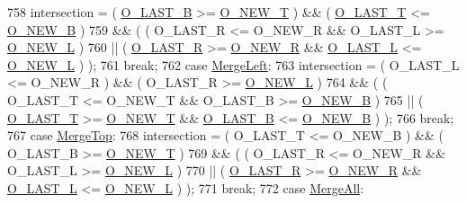 \begin{DoxyCode}
758                 intersection = ( \hyperlink{area_8h_acb5c5436194a8d4ad5b3c76166d25820}{O\_LAST\_B} >= \hyperlink{area_8h_a88003092895c0a5496264ade43c4ae60}{O\_NEW\_T} ) && ( 
      \hyperlink{area_8h_acf8cff7a963f611164914655a5fad217}{O\_LAST\_T} <= \hyperlink{area_8h_a4e865e98f50bf8070b1c2bfa6dd1eb3f}{O\_NEW\_B} )
759                                && ( ( O\_LAST\_R <= O\_NEW\_R && O\_LAST\_L >= \hyperlink{area_8h_a8a12d1980d75a4918cb7473c87253b3d}{O\_NEW\_L} )
760                                   || ( \hyperlink{area_8h_ad0961130bf7b05cc0225946ccdec8536}{O\_LAST\_R} >= \hyperlink{area_8h_a2102e0d0f3fd7e0313c5e99cc1a40522}{O\_NEW\_R} && 
      \hyperlink{area_8h_a19d8ec29fbb2b8db2051d5b6ae7bed55}{O\_LAST\_L} <= \hyperlink{area_8h_a8a12d1980d75a4918cb7473c87253b3d}{O\_NEW\_L} ) );
761                 \textcolor{keywordflow}{break};
762             \textcolor{keywordflow}{case} \hyperlink{namespaceOkular_ad98deec425adfb02ba05a78568bcccebadd181d06ce9bf13ee34d11b136c891dc}{MergeLeft}:
763                 intersection = ( O\_LAST\_L <= O\_NEW\_R ) && ( O\_LAST\_R >= \hyperlink{area_8h_a8a12d1980d75a4918cb7473c87253b3d}{O\_NEW\_L} )
764                                && ( ( O\_LAST\_T <= O\_NEW\_T && O\_LAST\_B >= \hyperlink{area_8h_a4e865e98f50bf8070b1c2bfa6dd1eb3f}{O\_NEW\_B} )
765                                   || ( \hyperlink{area_8h_acf8cff7a963f611164914655a5fad217}{O\_LAST\_T} >= \hyperlink{area_8h_a88003092895c0a5496264ade43c4ae60}{O\_NEW\_T} && 
      \hyperlink{area_8h_acb5c5436194a8d4ad5b3c76166d25820}{O\_LAST\_B} <= \hyperlink{area_8h_a4e865e98f50bf8070b1c2bfa6dd1eb3f}{O\_NEW\_B} ) );
766                 \textcolor{keywordflow}{break};
767             \textcolor{keywordflow}{case} \hyperlink{namespaceOkular_ad98deec425adfb02ba05a78568bccceba7e844b878ae71c6724c6762f26b41b8e}{MergeTop}:
768                 intersection = ( O\_LAST\_T <= O\_NEW\_B ) && ( O\_LAST\_B >= \hyperlink{area_8h_a88003092895c0a5496264ade43c4ae60}{O\_NEW\_T} )
769                                && ( ( O\_LAST\_R <= O\_NEW\_R && O\_LAST\_L >= \hyperlink{area_8h_a8a12d1980d75a4918cb7473c87253b3d}{O\_NEW\_L} )
770                                   || ( \hyperlink{area_8h_ad0961130bf7b05cc0225946ccdec8536}{O\_LAST\_R} >= \hyperlink{area_8h_a2102e0d0f3fd7e0313c5e99cc1a40522}{O\_NEW\_R} && 
      \hyperlink{area_8h_a19d8ec29fbb2b8db2051d5b6ae7bed55}{O\_LAST\_L} <= \hyperlink{area_8h_a8a12d1980d75a4918cb7473c87253b3d}{O\_NEW\_L} ) );
771                 \textcolor{keywordflow}{break};
772             \textcolor{keywordflow}{case} \hyperlink{namespaceOkular_ad98deec425adfb02ba05a78568bccceba7721ff1c43048d327e3809bdb53e8b9a}{MergeAll}:

\end{DoxyCode}
